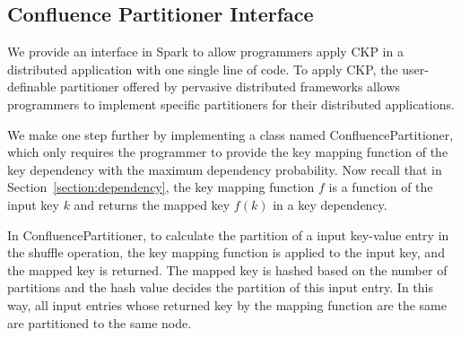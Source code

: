 \documentclass[10pt,journal,compsoc]{IEEEtran}
\begin{document}
\subsection{Confluence Partitioner Interface}

We provide an interface in Spark to allow programmers apply CKP in a
distributed application with one single line of code.
To apply CKP, the user-definable partitioner offered by pervasive distributed frameworks allows programmers to implement specific partitioners for their distributed applications. 

We make one step further by implementing a class named ConfluencePartitioner, 
which only requires the programmer to provide the key mapping function 
of the key dependency with the maximum dependency probability. 
Now recall that in Section~\ref{section:dependency}, the key mapping function
$f$
is a function of the input key $k$ and returns the mapped key $f(k)$ in a 
key dependency.

In ConfluencePartitioner, to calculate the partition of a input key-value entry in the shuffle operation, 
the key mapping function is applied to the input key, 
and the mapped key is returned. 
The mapped key is hashed based on the number of partitions 
and the hash value decides the partition of this input entry. 
In this way, all input entries whose returned key by the mapping function are the same are partitioned to the same node.
\end{document}
